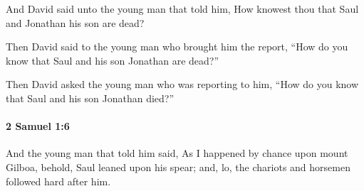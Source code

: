 			\begin{versebox}
					\item[BHS] 
					\item[ASV] And David said unto the young man that told him, How knowest thou that Saul and Jonathan his son are dead?
					\item[NIV] Then David said to the young man who brought him the report, “How do you know that Saul and his son Jonathan are dead?”
					\item[NRSV] Then David asked the young man who was reporting to him, “How do you know that Saul and his son Jonathan died?”
			\end{versebox}

		\paragraph{2 Samuel 1:6} %
			\label{2SAMUEL-1-6}

			And the young man that told him said, As I happened by chance upon mount Gilboa, behold, Saul leaned upon his spear; and, lo, the chariots and horsemen followed hard after him.

